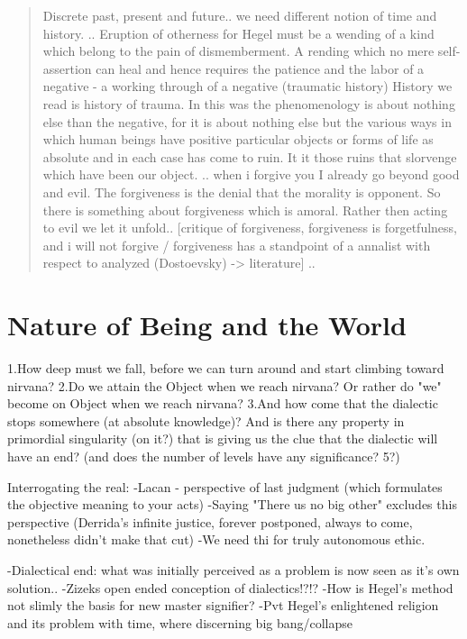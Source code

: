 \documentclass[10pt]{book}
\begin{document}
\begin{quotation}
Discrete past, present and future.. we need different notion of time and history. .. Eruption of otherness for Hegel must be a wending of a kind which belong to the pain of dismemberment. A rending which no mere self-assertion can heal and hence requires the patience and the labor of a negative - a working through of a negative (traumatic history) History we read is history of trauma. In this was the phenomenology is about nothing else than the negative, for it is about nothing else but the various ways in which human beings have positive particular objects or forms of life as absolute and in each case has come to ruin. It it those ruins that slorvenge which have been our object. .. when i forgive you I already go beyond good and evil. The forgiveness is the denial that the morality is opponent. So there is something about forgiveness which is amoral. Rather then acting to evil we let it unfold.. [critique of forgiveness, forgiveness is forgetfulness, and i will not forgive / forgiveness has a standpoint of a annalist with respect to analyzed (Dostoevsky) -> literature] ..
\end{quotation}
\chapter {Nature of Being and the World}

1.How deep must we fall, before we can turn around and start climbing toward nirvana?
2.Do we attain the Object when we reach nirvana? Or rather do "we" become on Object when we reach nirvana?
3.And how come that the dialectic stops somewhere (at absolute knowledge)? And is there any property in primordial singularity (on it?) that is giving us the clue that the dialectic will have an end? (and does the number of levels have any significance? 5?)

Interrogating the real:
-Lacan - perspective of last judgment (which formulates the objective meaning to your acts)
-Saying "There us no big other" excludes this perspective (Derrida's infinite justice, forever postponed, always to come, nonetheless didn't make that cut)
-We need thi for truly autonomous ethic.

-Dialectical end: what was initially perceived as a problem is now seen as it's own solution..
-Zizeks open ended conception of dialectics!?!?
-How is Hegel's method not slimly the basis for new master signifier?
-Pvt Hegel's enlightened religion and its problem with time, where discerning big bang/collapse
\end{document}
